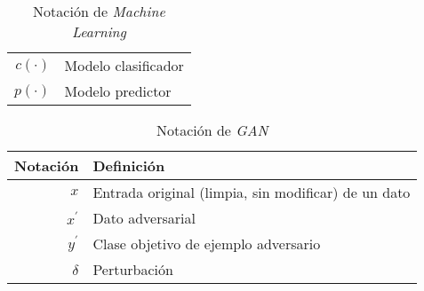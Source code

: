 \begin{table}[H]
\begin{center}
\begin{tabularx}{\textwidth}{|r|X|}
            $ {c}\left(\cdot\right) $                                                        & Modelo clasificador                                                                                                                                                             \\
            $ {p}\left(\cdot\right) $                                                        & Modelo predictor                                                                                                                                                                \\
            \hline
        \end{tabularx}
        \caption{Notación de \textit{Machine Learning}}
        \label{tab:notation-part-ml}
    \end{center}
\end{table}

\begin{table}[H]
    \begin{center}
        \begin{tabularx}{\textwidth}{|r|X|}
            \hline
            \textbf{Notación} & \textbf{Definición}                                 \\
            \hline %
            $ x $             & Entrada original (limpia, sin modificar) de un dato \\
            $ x^{\prime} $    & Dato adversarial                                    \\
            $ y^{\prime} $    & Clase objetivo de ejemplo adversario                \\
            $ \delta $        & Perturbación                                        \\

            \hline
        \end{tabularx}
        \caption{Notación de \textit{GAN}}
        \label{tab:notation-part-gans}
    \end{center}
\end{table}



